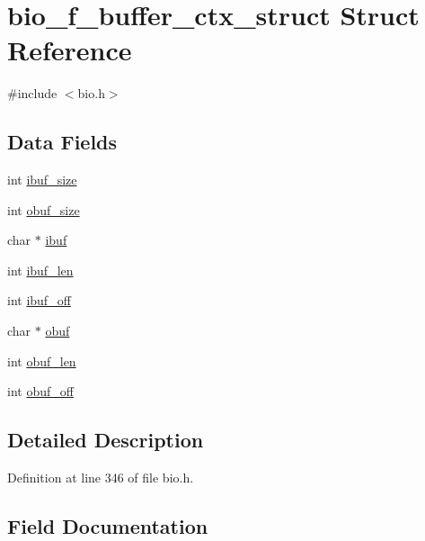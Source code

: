 \hypertarget{structbio__f__buffer__ctx__struct}{}\section{bio\+\_\+f\+\_\+buffer\+\_\+ctx\+\_\+struct Struct Reference}
\label{structbio__f__buffer__ctx__struct}


{\ttfamily \#include $<$bio.\+h$>$}

\subsection*{Data Fields}
\begin{DoxyCompactItemize}
\item 
int \hyperlink{structbio__f__buffer__ctx__struct_a957eab7c7be6abd1bdb4620d49c0cb43}{ibuf\+\_\+size}
\item 
int \hyperlink{structbio__f__buffer__ctx__struct_a7fd221c6aae25bce254fe649a8137927}{obuf\+\_\+size}
\item 
char $\ast$ \hyperlink{structbio__f__buffer__ctx__struct_aae0264040de8cb592ccedef7334b8a61}{ibuf}
\item 
int \hyperlink{structbio__f__buffer__ctx__struct_af4a0015d4604853e2849f78b40e513a1}{ibuf\+\_\+len}
\item 
int \hyperlink{structbio__f__buffer__ctx__struct_ac1602aa19d0d11a9994782835586b18c}{ibuf\+\_\+off}
\item 
char $\ast$ \hyperlink{structbio__f__buffer__ctx__struct_ae8c4ba5a37aa5951e2da06eed7f0da23}{obuf}
\item 
int \hyperlink{structbio__f__buffer__ctx__struct_ad1cccb2c2a10f9b619b14297345fa391}{obuf\+\_\+len}
\item 
int \hyperlink{structbio__f__buffer__ctx__struct_a53f2d1e0fe42f172c7d9d4d96765b76b}{obuf\+\_\+off}
\end{DoxyCompactItemize}


\subsection{Detailed Description}


Definition at line 346 of file bio.\+h.



\subsection{Field Documentation}
